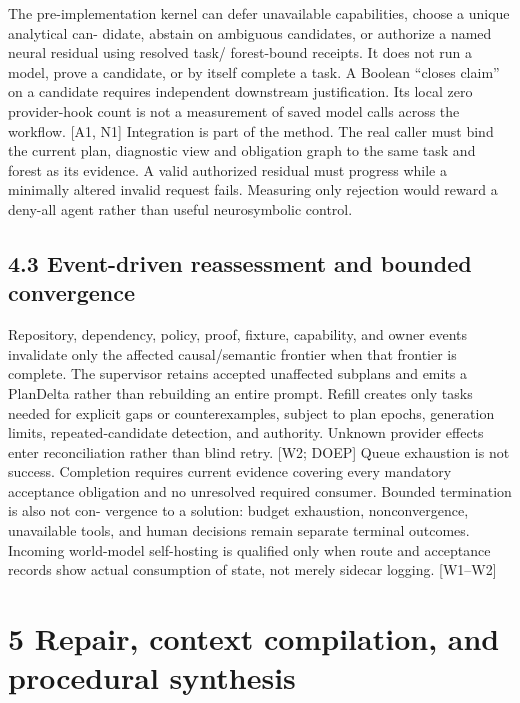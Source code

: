 \documentclass{article}
\begin{document}
The pre-implementation kernel can defer unavailable capabilities, choose a unique analytical can-
didate, abstain on ambiguous candidates, or authorize a named neural residual using resolved task/
forest-bound receipts. It does not run a model, prove a candidate, or by itself complete a task. A
Boolean “closes claim” on a candidate requires independent downstream justification. Its local zero
provider-hook count is not a measurement of saved model calls across the workflow. [A1, N1]
Integration is part of the method. The real caller must bind the current plan, diagnostic view and
obligation graph to the same task and forest as its evidence. A valid authorized residual must progress
while a minimally altered invalid request fails. Measuring only rejection would reward a deny-all
agent rather than useful neurosymbolic control.

\subsection*{4.3 Event-driven reassessment and bounded convergence}

Repository, dependency, policy, proof, fixture, capability, and owner events invalidate only the
affected causal/semantic frontier when that frontier is complete. The supervisor retains accepted
unaffected subplans and emits a PlanDelta rather than rebuilding an entire prompt. Refill creates
only tasks needed for explicit gaps or counterexamples, subject to plan epochs, generation limits,
repeated-candidate detection, and authority. Unknown provider effects enter reconciliation rather
than blind retry. [W2; DOEP]
Queue exhaustion is not success. Completion requires current evidence covering every mandatory
acceptance obligation and no unresolved required consumer. Bounded termination is also not con-
vergence to a solution: budget exhaustion, nonconvergence, unavailable tools, and human decisions
remain separate terminal outcomes. Incoming world-model self-hosting is qualified only when route
and acceptance records show actual consumption of state, not merely sidecar logging. [W1–W2]

\section*{5 Repair, context compilation, and procedural synthesis}
\end{document}
